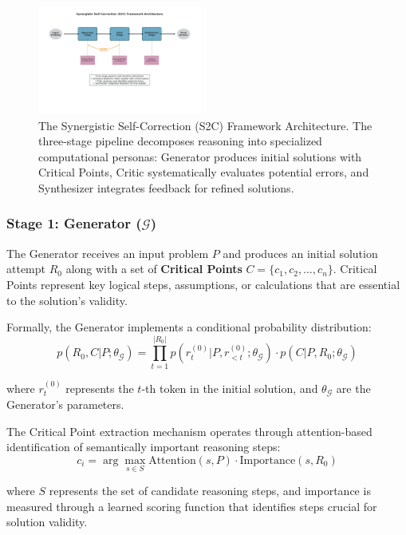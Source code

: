 \documentclass[10pt,twocolumn]{article}
\newcommand{\Generator}{\mathcal{G}}
\begin{document}
\begin{figure}[t]
\centering
\includegraphics[width=0.48\textwidth]{graphs/s2c_framework_architecture.pdf}
\caption{The Synergistic Self-Correction (S2C) Framework Architecture. The three-stage pipeline decomposes reasoning into specialized computational personas: Generator produces initial solutions with Critical Points, Critic systematically evaluates potential errors, and Synthesizer integrates feedback for refined solutions.}
\label{fig:s2c_architecture}
\end{figure}

\subsubsection{Stage 1: Generator ($\Generator$)}

The Generator receives an input problem $P$ and produces an initial solution attempt $R_0$ along with a set of \textbf{Critical Points} $C = \{c_1, c_2, \ldots, c_n\}$. Critical Points represent key logical steps, assumptions, or calculations that are essential to the solution's validity.

Formally, the Generator implements a conditional probability distribution:
\begin{equation}
p(R_0, C | P; \theta_{\Generator}) = \prod_{t=1}^{|R_0|} p(r_t^{(0)} | P, r_{<t}^{(0)}; \theta_{\Generator}) \cdot p(C | P, R_0; \theta_{\Generator})
\end{equation}

where $r_t^{(0)}$ represents the $t$-th token in the initial solution, and $\theta_{\Generator}$ are the Generator's parameters.

The Critical Point extraction mechanism operates through attention-based identification of semantically important reasoning steps:
\begin{equation}
c_i = \arg\max_{s \in S} \text{Attention}(s, P) \cdot \text{Importance}(s, R_0)
\end{equation}

where $S$ represents the set of candidate reasoning steps, and importance is measured through a learned scoring function that identifies steps crucial for solution validity.
\end{document}
